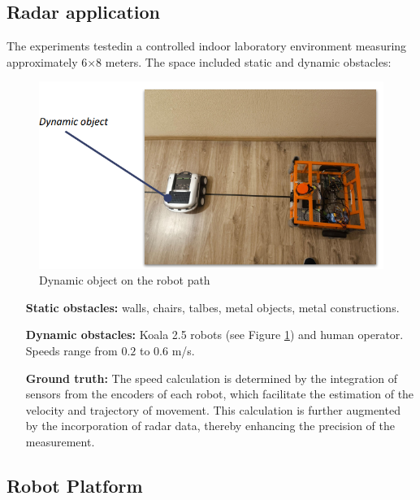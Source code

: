 
\sloppy
\subsection{Radar application}

The experiments testedin a controlled indoor laboratory environment measuring approximately 6×8 meters. The space included static and dynamic obstacles:

\begin{figure}[H]
    \centering
    \includegraphics[width=0.5\linewidth]{Src//images/koalarobot.png}
    \caption{Dynamic object on the robot path}
    \label{fig:Objectkoala}
\end{figure}

\begin{itemize}
    \item[\textbf{Static obstacles:}] walls, chairs, talbes, metal objects, metal constructions.
    \item[\textbf{Dynamic obstacles:}] Koala 2.5 robots (see Figure \ref{fig:Objectkoala}) and human operator. Speeds range from $0.2$ to $0.6$ m/s.
    \item[\textbf{Ground truth:}] The speed calculation is determined by the integration of sensors from the encoders of each robot, which facilitate the estimation of the velocity and trajectory of movement. This calculation is further augmented by the incorporation of radar data, thereby enhancing the precision of the measurement.




    
\end{itemize}

\subsection{Robot Platform}



